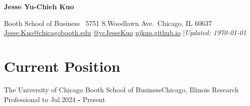 \documentclass{smoothThemeCV}
\newlength{\hvspace}
\begin{document}
\begin{center}
    \noindent\textbf{\LARGE Jesse Yu-Chieh Kuo} \\
\end{center}
\vspace{\hvspace}
\hline
\vspace{\hvspace}
\begin{center}
    \noindent Booth School of Business \textbullet\ 5751 S.\@ Woodlawn Ave.\@ \textbullet\ Chicago, IL 60637 \\
    \noindent\faEnvelopeO\enskip \href{mailto:Jesse.Kuo@chicagobooth.edu}{Jesse.Kuo@chicagobooth.edu}\enskip
    \faTwitter\enskip\href{https://twitter.com/ycJesseKuo}{@ycJesseKuo}\enskip
    \faGlobe\enskip\href{https://ujkuo.github.io}{ujkuo.github.io}\enskip
    |\enskip \textit{Updated: \today} \\
\end{center}
\vspace{\hvspace}
\hline
\vspace{-10pt}

\section*{Current Position}
\resumeSubHeadingListStart

\resumeSubheading
{The University of Chicago Booth School of Business}{Chicago, Illinois}
{Research Professional to }
{Jul.\@ 2024 \textbf{-} Present} 

\resumeSubHeadingListEnd












\end{document}
